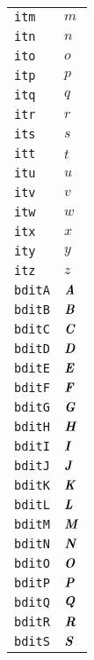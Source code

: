 \begin{longtable}{ll}
\texttt{itm}&${}{\textit{m}}{}$\\
\texttt{itn}&${}{\textit{n}}{}$\\
\texttt{ito}&${}{\textit{o}}{}$\\
\texttt{itp}&${}{\textit{p}}{}$\\
\texttt{itq}&${}{\textit{q}}{}$\\
\texttt{itr}&${}{\textit{r}}{}$\\
\texttt{its}&${}{\textit{s}}{}$\\
\texttt{itt}&${}{\textit{t}}{}$\\
\texttt{itu}&${}{\textit{u}}{}$\\
\texttt{itv}&${}{\textit{v}}{}$\\
\texttt{itw}&${}{\textit{w}}{}$\\
\texttt{itx}&${}{\textit{x}}{}$\\
\texttt{ity}&${}{\textit{y}}{}$\\
\texttt{itz}&${}{\textit{z}}{}$\\
\texttt{bditA}&${}{\textbf{\textit{A}}}{}$\\
\texttt{bditB}&${}{\textbf{\textit{B}}}{}$\\
\texttt{bditC}&${}{\textbf{\textit{C}}}{}$\\
\texttt{bditD}&${}{\textbf{\textit{D}}}{}$\\
\texttt{bditE}&${}{\textbf{\textit{E}}}{}$\\
\texttt{bditF}&${}{\textbf{\textit{F}}}{}$\\
\texttt{bditG}&${}{\textbf{\textit{G}}}{}$\\
\texttt{bditH}&${}{\textbf{\textit{H}}}{}$\\
\texttt{bditI}&${}{\textbf{\textit{I}}}{}$\\
\texttt{bditJ}&${}{\textbf{\textit{J}}}{}$\\
\texttt{bditK}&${}{\textbf{\textit{K}}}{}$\\
\texttt{bditL}&${}{\textbf{\textit{L}}}{}$\\
\texttt{bditM}&${}{\textbf{\textit{M}}}{}$\\
\texttt{bditN}&${}{\textbf{\textit{N}}}{}$\\
\texttt{bditO}&${}{\textbf{\textit{O}}}{}$\\
\texttt{bditP}&${}{\textbf{\textit{P}}}{}$\\
\texttt{bditQ}&${}{\textbf{\textit{Q}}}{}$\\
\texttt{bditR}&${}{\textbf{\textit{R}}}{}$\\
\texttt{bditS}&${}{\textbf{\textit{S}}}{}$\\

\end{longtable}
